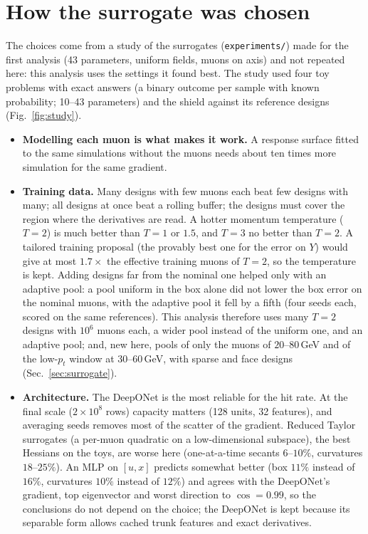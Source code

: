 \documentclass[11pt,a4paper]{article}
\begin{document}
\section{How the surrogate was chosen}
\label{app:study}

The choices come from a study of the surrogates (\texttt{experiments/}) made for the first
analysis (43 parameters, uniform fields, muons on axis) and not repeated here: this analysis uses
the settings it found best. The study used four toy problems with exact answers (a binary outcome
per sample with known probability; 10--43 parameters) and the shield against its reference
designs (Fig.~\ref{fig:study}).
\begin{itemize}
  \item \textbf{Modelling each muon is what makes it work.} A response surface fitted to the same
        simulations without the muons needs about ten times more simulation for the same gradient.
  \item \textbf{Training data.} Many designs with few muons each beat few designs with many; all
        designs at once beat a rolling buffer; the designs must cover the region where the
        derivatives are read. A hotter momentum temperature ($T=2$) is much better than $T=1$ or
        $1.5$, and $T=3$ no better than $T=2$. A tailored training proposal (the provably best one
        for the error on $Y$) would give at most $1.7\times$ the effective training muons of
        $T=2$, so the temperature is kept. Adding designs far from the nominal one helped only
        with an adaptive pool: a pool uniform in the box alone did not lower the box error on the
        nominal muons, with the adaptive pool it fell by a fifth (four seeds each, scored on the
        same references). This analysis therefore uses many $T=2$ designs with $10^6$ muons each,
        a wider pool instead of the uniform one, and an adaptive pool; and, new here, pools of
        only the muons of $20$--$80$\,GeV and of the low-$p_t$ window at $30$--$60$\,GeV, with
        sparse and face designs (Sec.~\ref{sec:surrogate}).
  \item \textbf{Architecture.} The DeepONet is the most reliable for the hit rate. At the final
        scale ($2\times10^8$ rows) capacity matters (128 units, 32 features), and averaging seeds
        removes most of the scatter of the gradient. Reduced Taylor surrogates (a per-muon
        quadratic on a low-dimensional subspace), the best Hessians on the toys, are worse here
        (one-at-a-time secants $6$--$10\%$, curvatures $18$--$25\%$). An MLP on $[u,x]$ predicts
        somewhat better (box $11\%$ instead of $16\%$, curvatures $10\%$ instead of $12\%$) and
        agrees with the DeepONet's gradient, top eigenvector and worst direction to
        $\cos=0.99$, so the conclusions do not depend on the choice; the DeepONet is kept because
        its separable form allows cached trunk features and exact derivatives.
\end{itemize}
\end{document}

